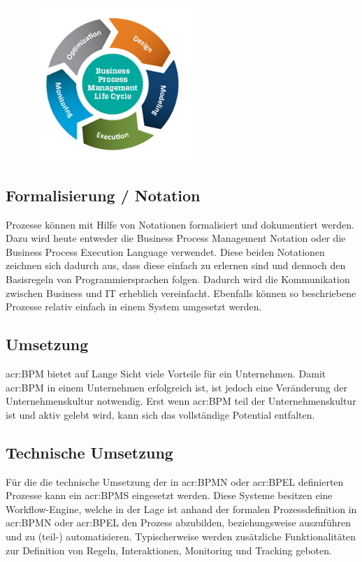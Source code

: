 \begin{figure}[H]
  \centering
  \includegraphics[width=6cm]{./images/BPMN_Lifecycle}
\end{figure}


\subsection{Formalisierung / Notation }
Prozesse können mit Hilfe von Notationen formalisiert und dokumentiert werden. Dazu wird heute entweder die Business Process Management Notation oder die Business Process Execution Language verwendet. Diese beiden Notationen zeichnen sich dadurch aus, dass diese einfach zu erlernen sind und dennoch den Basisregeln von Programmiersprachen folgen. Dadurch wird die Kommunikation zwischen Business und IT erheblich vereinfacht. Ebenfalls können so beschriebene Prozesse relativ einfach in einem System umgesetzt werden.

\subsection{Umsetzung}
\gls{acr:BPM} bietet auf Lange Sicht viele Vorteile für ein Unternehmen. Damit \gls{acr:BPM} in einem Unternehmen erfolgreich ist, ist jedoch eine Veränderung der Unternehmenskultur notwendig. Erst wenn \gls{acr:BPM} teil der Unternehmenskultur ist und aktiv gelebt wird, kann sich das vollständige Potential entfalten.

\subsection{Technische Umsetzung}
Für die die technische Umsetzung der in \gls{acr:BPMN} oder \gls{acr:BPEL} definierten Prozesse kann ein \gls{acr:BPMS} eingesetzt werden. Diese Systeme besitzen eine Workflow-Engine, welche in der Lage ist anhand der formalen Prozessdefinition in \gls{acr:BPMN} oder \gls{acr:BPEL} den Prozess abzubilden, beziehungsweise auszuführen und zu (teil-) automatisieren. Typischerweise werden zusätzliche Funktionalitäten zur Definition von Regeln, Interaktionen, Monitoring und Tracking geboten.

